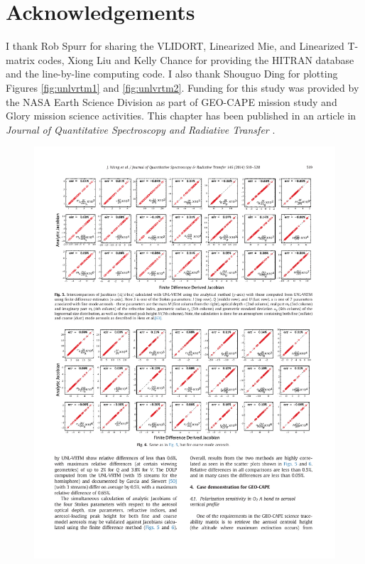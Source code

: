 \section{Acknowledgements}
I thank Rob Spurr for sharing the VLIDORT, Linearized Mie, and
Linearized T-matrix codes, Xiong Liu and Kelly Chance for providing the
HITRAN database and the line-by-line computing code. I also thank
Shouguo Ding for plotting Figures \ref{fig:unlvrtm1} and
\ref{fig:unlvrtm2}. Funding for this study was provided by the NASA
Earth Science Division as part of GEO-CAPE mission study and Glory
mission science activities. This chapter has been published in an article in
\textit{Journal of Quantitative Spectroscopy and Radiative Transfer}
\citep{Wang14}.  

\begin{landscape}
\begin{figure}[p]
  \centering
  \includegraphics[width={1.4\textwidth}]{figures/unlvrtm4.pdf}

\end{figure}
\end{landscape}
